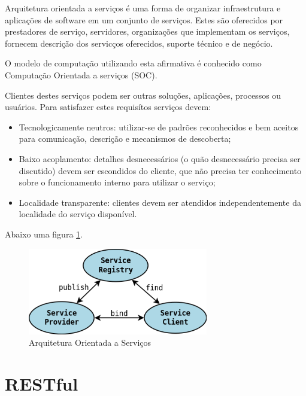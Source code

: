 Arquitetura orientada a servi\c{c}os \'e uma forma de organizar infraestrutura e aplica\c{c}\~oes de software em um conjunto de servi\c{c}os. Estes s\~ao oferecidos por prestadores de servi\c{c}o, servidores, organiza\c{c}\~oes que implementam os servi\c{c}os, fornecem descri\c{c}\~ao dos servic\c{c}os oferecidos, suporte t\'ecnico e de neg\'ocio.

O modelo de computa\c{c}\~ao utilizando esta afirmativa \'e conhecido como Computa\c{c}\~ao Orientada a servi\c{c}os (SOC). \cite{581580}

Clientes destes servi\c{c}os podem ser outras solu\c{c}\~oes, aplica\c{c}\~oes, processos ou usu\'arios. Para satisfazer estes requis\'itos servi\c{c}os devem:
\begin{itemize}
\item Tecnologicamente neutros: utilizar-se de padr\~oes reconhecidos e bem aceitos para comunica\c{c}\~ao, descri\c{c}\~ao e mecanismos de descoberta;
\item Baixo acoplamento: detalhes desnecess\'arios (o qu\~ao desnecess\'ario precisa ser discutido) devem ser escondidos do cliente, que n\~ao precisa ter conhecimento sobre o funcionamento interno para utilizar o servi\c{c}o;
\item Localidade transparente: clientes devem ser atendidos independentemente da localidade do servi\c{c}o dispon\'ivel.
\end{itemize}

Abaixo uma figura \ref{fig:b}.

\begin{figure}
   \label{fig:b}
   \centering
   \includegraphics[width=0.7\textwidth]{figuras/soa.png}
   \caption{Arquitetura Orientada a Servi\c{c}os}
\end{figure}

\cite{perrey2003service}


\section{RESTful}

